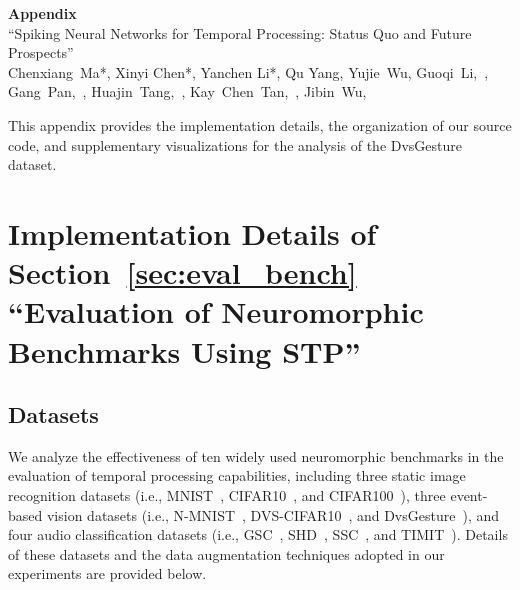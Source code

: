 
\appendices


\setcounter{page}{1}

\Large
\begin{center}
    {\bf \LARGE Appendix}\\
    \vspace{0.2cm}
    {\large ``Spiking Neural Networks for Temporal Processing: Status Quo and Future Prospects''}\\
	\vspace{0.2cm}
    {\normalsize Chenxiang~Ma{*}, Xinyi Chen{*}, Yanchen Li{*}, Qu Yang, Yujie~Wu, Guoqi~Li,~, Gang~Pan,~,  Huajin~Tang,~, Kay~Chen~Tan,~, Jibin~Wu,~}\\
\end{center}


\small


This appendix provides the implementation details, the organization of our source code, and supplementary visualizations for the analysis of the DvsGesture dataset.

\section{Implementation Details of Section~\ref{sec:eval_bench} ``Evaluation of Neuromorphic Benchmarks Using STP''}
\label{app:imp_det_exsiting_bench}
\subsection{Datasets}
We analyze the effectiveness of ten widely used neuromorphic benchmarks in the evaluation of temporal processing capabilities, including three static image recognition datasets (i.e., MNIST~\cite{lecun1998gradient}, CIFAR10~\cite{krizhevsky2009learning}, and CIFAR100~\cite{krizhevsky2009learning}), three event-based vision datasets (i.e., N-MNIST~\cite{orchard2015converting}, DVS-CIFAR10~\cite{li2017cifar10}, and DvsGesture~\cite{amir2017low}), and four audio classification datasets (i.e., GSC~\cite{warden2018speech}, SHD~\cite{cramer2020heidelberg}, SSC~\cite{cramer2020heidelberg}, and TIMIT~\cite{TIMIT}). Details of these datasets and the data augmentation techniques adopted in our experiments are provided below.

